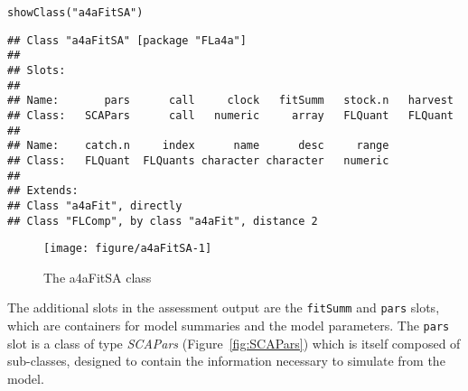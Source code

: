 \documentclass[a4paper,english,10pt]{article}\usepackage[]{graphicx}\usepackage[]{color}
\makeatletter
\def\maxwidth{ %
  \ifdim\Gin@nat@width>\linewidth
    \linewidth
  \else
    \Gin@nat@width
  \fi
}
\newcommand{\hlstr}[1]{\textcolor[rgb]{0.2,0.2,0.2}{#1}}%
\newcommand{\hlstd}[1]{\textcolor[rgb]{0,0,0}{#1}}%
\newcommand{\hlkwd}[1]{\textcolor[rgb]{0.361,0.506,0.596}{#1}}%
\newenvironment{kframe}{%
 \def\at@end@of@kframe{}%
 \ifinner\ifhmode%
  \def\at@end@of@kframe{\end{minipage}}%
  \begin{minipage}{\columnwidth}%
 \fi\fi%
 \def\FrameCommand##1{\hskip\@totalleftmargin \hskip-\fboxsep
 \colorbox{shadecolor}{##1}\hskip-\fboxsep
     \hskip-\linewidth \hskip-\@totalleftmargin \hskip\columnwidth}%
 \MakeFramed {\advance\hsize-\width
   \@totalleftmargin\z@ \linewidth\hsize
   \@setminipage}}%
 {\par\unskip\endMakeFramed%
 \at@end@of@kframe}
\newenvironment{knitrout}{}{} %
\newcommand{\code}[1]{{\texttt{#1}}}
\newcommand{\class}[1]{{\textit{#1}}}
\makeatother
\begin{document}
\begin{knitrout}
\color{fgcolor}\begin{kframe}
\begin{alltt}
\hlkwd{showClass}\hlstd{(}\hlstr{"a4aFitSA"}\hlstd{)}
\end{alltt}
\begin{verbatim}
## Class "a4aFitSA" [package "FLa4a"]
## 
## Slots:
##                                                                   
## Name:       pars      call     clock   fitSumm   stock.n   harvest
## Class:   SCAPars      call   numeric     array   FLQuant   FLQuant
##                                                         
## Name:    catch.n     index      name      desc     range
## Class:   FLQuant  FLQuants character character   numeric
## 
## Extends: 
## Class "a4aFit", directly
## Class "FLComp", by class "a4aFit", distance 2
\end{verbatim}
\end{kframe}
\end{knitrout}

\begin{knitrout}
\color{fgcolor}\begin{figure}[H]

{\centering \texttt{[image: figure/a4aFitSA-1]} 

}

\caption[The a4aFitSA class]{The a4aFitSA class}\label{fig:a4aFitSA}
\end{figure}


\end{knitrout}

The additional slots in the assessment output are the \code{fitSumm} and \code{pars} slots, which are containers for model summaries and the model parameters. The \code{pars} slot is a class of type \class{SCAPars} (Figure~\ref{fig:SCAPars}) which is itself composed of sub-classes, designed to contain the information necessary to simulate from the model.
\end{document}
